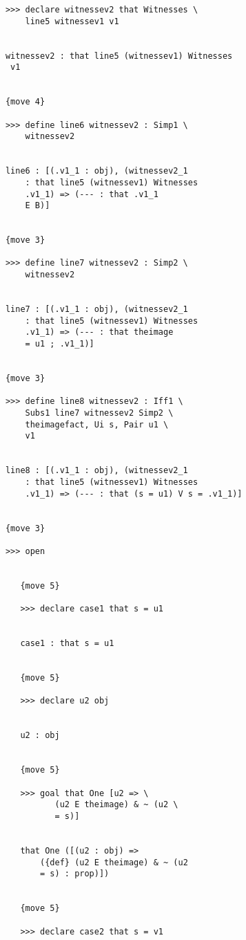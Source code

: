 \documentclass[12pt]{article}
\begin{document}
\begin{verbatim}
            >>> declare witnessev2 that Witnesses \
                line5 witnessev1 v1


            witnessev2 : that line5 (witnessev1) Witnesses 
             v1


            {move 4}

            >>> define line6 witnessev2 : Simp1 \
                witnessev2


            line6 : [(.v1_1 : obj), (witnessev2_1 
                : that line5 (witnessev1) Witnesses 
                .v1_1) => (--- : that .v1_1 
                E B)]


            {move 3}

            >>> define line7 witnessev2 : Simp2 \
                witnessev2


            line7 : [(.v1_1 : obj), (witnessev2_1 
                : that line5 (witnessev1) Witnesses 
                .v1_1) => (--- : that theimage 
                = u1 ; .v1_1)]


            {move 3}

            >>> define line8 witnessev2 : Iff1 \
                Subs1 line7 witnessev2 Simp2 \
                theimagefact, Ui s, Pair u1 \
                v1


            line8 : [(.v1_1 : obj), (witnessev2_1 
                : that line5 (witnessev1) Witnesses 
                .v1_1) => (--- : that (s = u1) V s = .v1_1)]


            {move 3}

            >>> open


               {move 5}

               >>> declare case1 that s = u1


               case1 : that s = u1


               {move 5}

               >>> declare u2 obj


               u2 : obj


               {move 5}

               >>> goal that One [u2 => \
                      (u2 E theimage) & ~ (u2 \
                      = s)]


               that One ([(u2 : obj) => 
                   ({def} (u2 E theimage) & ~ (u2 
                   = s) : prop)])


               {move 5}

               >>> declare case2 that s = v1



\end{verbatim}
\end{document}
